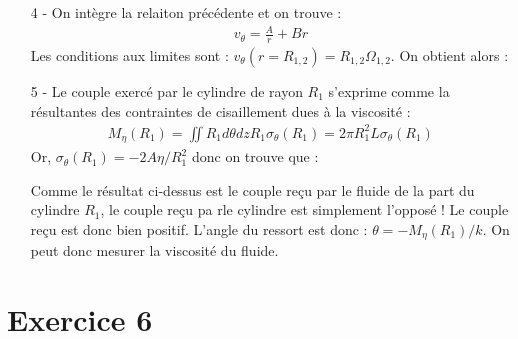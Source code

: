 \documentclass{report}
\begin{document}
\begin{itemize}
\noindent{}
	
	\item[4 - ] On intègre la relaiton précédente et on trouve :
	\begin{align*}
		v_\theta = \frac{A}{r} + Br
	\end{align*}
	Les conditions aux limites sont : $v_\theta(r=R_{1,2})=R_{1,2}\Omega_{1,2}$. On obtient alors : 
	
	\noindent{}

\item[5 - ] Le couple exercé par le cylindre de rayon $R_1$ s'exprime comme la résultantes des contraintes de cisaillement dues à la viscosité :
\begin{align*}
	M_{\eta}(R_1)=\iint R_1d\theta dz R_1\sigma_\theta(R_1)= 2\pi R_1^2L\sigma_\theta(R_1)
\end{align*}
Or, $\sigma_\theta(R_1) = -2A\eta/R_1^2$ donc on trouve que :

\noindent{}

Comme le résultat ci-dessus est le couple reçu par le fluide de la part du cylindre $R_1$, le couple reçu pa rle cylindre est simplement l'opposé ! Le couple reçu est donc bien positif.
L'angle du ressort est donc : $\theta = -M_{\eta}(R_1)/k$. On peut donc mesurer la viscosité du fluide.


\end{itemize}

\newpage

\section{Exercice 6}
\end{document}
